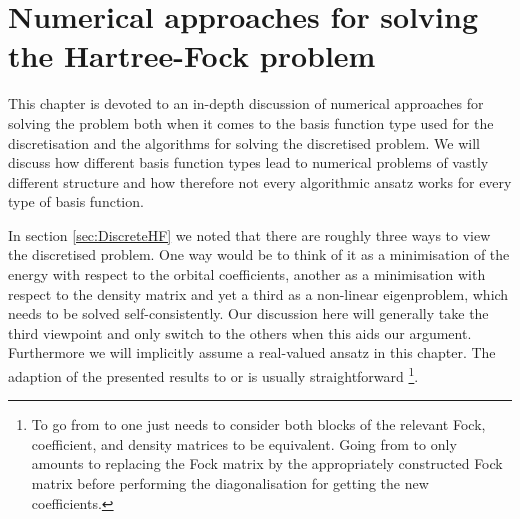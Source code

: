 \chapter{Numerical approaches for solving the Hartree-Fock problem}
\label{ch:NumSolveHF}

This chapter is devoted to an in-depth discussion of
numerical approaches for solving the \HF problem
both when it comes to the basis function type used for the discretisation
and the algorithms for solving the discretised problem.
We will discuss how different basis function types
lead to numerical problems of vastly different structure
and how therefore not every algorithmic ansatz works
for every type of basis function.

In section \ref{sec:DiscreteHF} we noted that there are
roughly three ways to view the discretised \HF problem.
One way would be to think of it as a minimisation of the energy
with respect to the orbital coefficients,
another as a minimisation with respect to the density matrix
and yet a third as a non-linear eigenproblem,
which needs to be solved self-consistently.
Our discussion here will generally take the third viewpoint
and only switch to the others when this aids our argument.
Furthermore we will implicitly assume a real-valued
\UHF ansatz in this chapter.
The adaption of the presented results to
\RHF or \ROHF is usually straightforward%
\footnote{
To go from \UHF to \RHF one just needs to consider both blocks of the relevant
Fock, coefficient, and density matrices to be equivalent.
Going from \UHF to \ROHF only amounts to replacing the \UHF Fock matrix
by the appropriately constructed \ROHF Fock matrix before performing
the diagonalisation for getting the new coefficients.
}.






